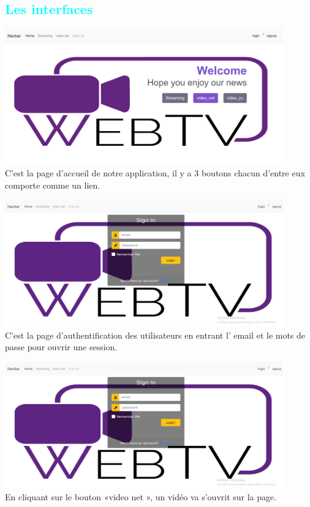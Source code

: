 \subsection{\textcolor{cyan}{Les interfaces}}
    \centering
    \includegraphics[width=12cm]{images/indexPage.png}\\
C’est la page d’accueil de notre application, il y a 3 boutons chacun d’entre eux comporte comme un lien.\par
    \includegraphics[width=12cm]{images/authentificationPage.png}\\
    C’est la page d’authentification des utilisateurs en entrant l’ email et le mots de passe pour ouvrir une session.\par
    \includegraphics[width=12cm]{images/authentificationPage.png}\\
    En cliquant sur le bouton «video net », un vidéo va s’ouvrit sur la page.\par
